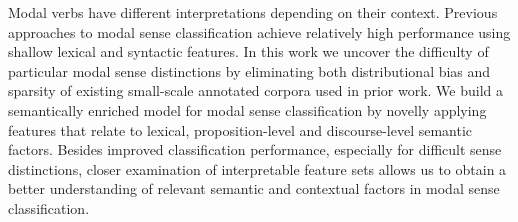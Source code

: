Modal verbs have different interpretations depending on their context. Previous approaches to modal sense classification achieve relatively high performance using shallow lexical and syntactic features. In this work we uncover the difficulty of particular modal sense distinctions by eliminating both distributional bias and sparsity of existing small-scale annotated corpora used in prior work. We build a semantically enriched model for modal sense classification by novelly applying features that relate to lexical, proposition-level and discourse-level semantic factors. Besides improved classification performance, especially for difficult sense distinctions, closer examination of interpretable feature sets allows us to obtain a better understanding of relevant semantic and contextual factors in modal sense classification.
